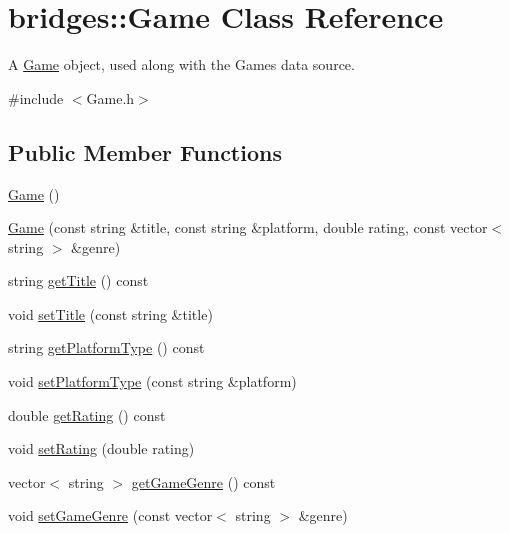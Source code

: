 \hypertarget{classbridges_1_1_game}{}\section{bridges\+::Game Class Reference}
\label{classbridges_1_1_game}


A \mbox{\hyperlink{classbridges_1_1_game}{Game}} object, used along with the Games data source.  




{\ttfamily \#include $<$Game.\+h$>$}

\subsection*{Public Member Functions}
\begin{DoxyCompactItemize}
\item 
\mbox{\hyperlink{classbridges_1_1_game_a44f625a03ebf144931aa9e7e5440303c}{Game}} ()
\item 
\mbox{\hyperlink{classbridges_1_1_game_a2cc784203a2e9ab69141eb45714cb5db}{Game}} (const string \&title, const string \&platform, double rating, const vector$<$ string $>$ \&genre)
\item 
string \mbox{\hyperlink{classbridges_1_1_game_af150b6b98fc9ec033873aa6fb3b3f7bb}{get\+Title}} () const
\item 
void \mbox{\hyperlink{classbridges_1_1_game_af5c88115cd037f6d5853fdf1ff79f3a3}{set\+Title}} (const string \&title)
\item 
string \mbox{\hyperlink{classbridges_1_1_game_a450395f308c0f5fec1bfd83295630493}{get\+Platform\+Type}} () const
\item 
void \mbox{\hyperlink{classbridges_1_1_game_aa31882c5e10583faee89379c0e8b9056}{set\+Platform\+Type}} (const string \&platform)
\item 
double \mbox{\hyperlink{classbridges_1_1_game_ac4034068074e006ac6c1fddca6a63791}{get\+Rating}} () const
\item 
void \mbox{\hyperlink{classbridges_1_1_game_a0b9b3180975b2d3028b9090559bb6624}{set\+Rating}} (double rating)
\item 
vector$<$ string $>$ \mbox{\hyperlink{classbridges_1_1_game_a2c335f413572a74d3e645c42ba6ec57a}{get\+Game\+Genre}} () const
\item 
void \mbox{\hyperlink{classbridges_1_1_game_a3096d8ceea27035800b246e59bcb520a}{set\+Game\+Genre}} (const vector$<$ string $>$ \&genre)
\end{DoxyCompactItemize}


